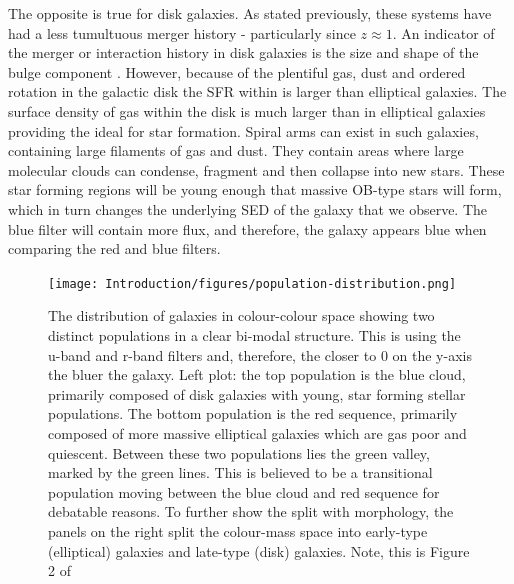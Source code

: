 The opposite is true for disk galaxies. As stated previously, these systems have had a less tumultuous merger history - particularly since $z \approx 1$. An indicator of the merger or interaction history in disk galaxies is the size and shape of the bulge component \citep{2011MNRAS.414..888E}. However, because of the plentiful gas, dust and ordered rotation in the galactic disk the SFR within is larger than elliptical galaxies. The surface density of gas within the disk is much larger than in elliptical galaxies providing the ideal for star formation. Spiral arms can exist in such galaxies, containing large filaments of gas and dust. They contain areas where large molecular clouds can condense, fragment and then collapse into new stars. These star forming regions will be young enough that massive OB-type stars will form, which in turn changes the underlying SED of the galaxy that we observe. The blue filter will contain more flux, and therefore, the galaxy appears blue when comparing the red and blue filters.

\begin{figure}
\centering
\texttt{[image: Introduction/figures/population-distribution.png]}
\caption[The distribution of galaxies in colour-colour space showing two distinct populations in a clear bi-modal structure.]{The distribution of galaxies in colour-colour space showing two distinct populations in a clear bi-modal structure. This is using the u-band and r-band filters and, therefore, the closer to 0 on the y-axis the bluer the galaxy. Left plot: the top population is the blue cloud, primarily composed of disk galaxies with young, star forming stellar populations. The bottom population is the red sequence, primarily composed of more massive elliptical galaxies which are gas poor and quiescent. Between these two populations lies the green valley, marked by the green lines. This is believed to be a transitional population moving between the blue cloud and red sequence for debatable reasons. To further show the split with morphology, the panels on the right split the colour-mass space into early-type (elliptical) galaxies and late-type (disk) galaxies. Note, this is Figure 2 of \citet{2014MNRAS.440..889S}}
\label{fig:blue-red-population}
\end{figure}

